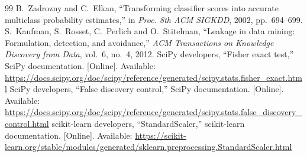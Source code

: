 \documentclass[conference,a4paper]{IEEEtran}
\begin{document}
\begin{thebibliography}{99}
 B.~Zadrozny and C.~Elkan, ``Transforming classifier scores into accurate multiclass probability estimates,'' in \emph{Proc. 8th ACM SIGKDD}, 2002, pp.~694--699.
 S.~Kaufman, S.~Rosset, C.~Perlich and O.~Stitelman, ``Leakage in data mining: Formulation, detection, and avoidance,'' \emph{ACM Transactions on Knowledge Discovery from Data}, vol.~6, no.~4, 2012.
 SciPy developers, ``Fisher exact test,'' SciPy documentation. [Online]. Available: \url{https://docs.scipy.org/doc/scipy/reference/generated/scipy.stats.fisher_exact.html}
 SciPy developers, ``False discovery control,'' SciPy documentation. [Online]. Available: \url{https://docs.scipy.org/doc/scipy/reference/generated/scipy.stats.false_discovery_control.html}
 scikit-learn developers, ``StandardScaler,'' scikit-learn documentation. [Online]. Available: \url{https://scikit-learn.org/stable/modules/generated/sklearn.preprocessing.StandardScaler.html}
\end{thebibliography}
\end{document}
